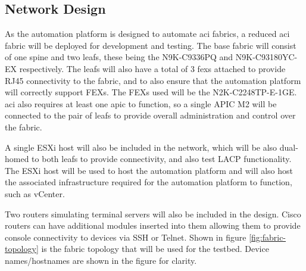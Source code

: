 \subsection{Network Design}
\label{design:Testbed:network-design}
As the automation platform is designed to automate \gls{aci} fabrics, a reduced \gls{aci} fabric will be deployed for development and testing. The base fabric will consist of one spine and two leafs, these being the N9K-C9336PQ and N9K-C93180YC-EX respectively. The leafs will also have a total of 3 \gls{fex}s attached to provide RJ45 connectivity to the fabric, and to also ensure that the automation platform will correctly support FEXs. The FEXs used will be the N2K-C2248TP-E-1GE. \gls{aci} also requires at least one \gls{apic} to function, so a single APIC M2 will be connected to the pair of leafs to provide overall administration and control over the fabric.

A single ESXi host will also be included in the network, which will be also dual-homed to both leafs to provide connectivity, and also test LACP functionality. The ESXi host will be used to host the automation platform and will also host the associated infrastructure required for the automation platform to function, such as vCenter.

Two routers simulating terminal servers will also be included in the design. Cisco routers can have additional modules inserted into them allowing them to provide console connectivity to devices via SSH or Telnet.
Shown in figure \ref{fig:fabric-topology} is the fabric topology that will be used for the testbed. Device names/hostnames are shown in the figure for clarity.

